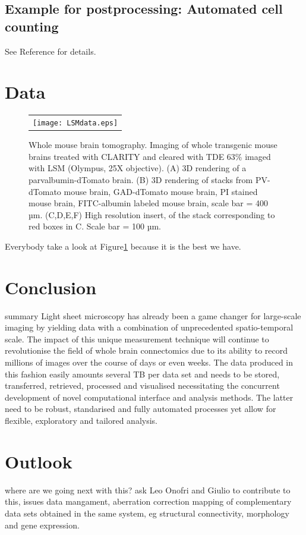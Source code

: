 \documentclass[12pt]{spieman}  %
\begin{document}
	\subsection{Example for postprocessing: Automated cell counting}
	See Reference\cite{Frasconi2014} for details.


\section{Data}

	\begin{figure}
   \begin{center}
   \begin{tabular}{c}
   \texttt{[image: LSMdata.eps]}
   \end{tabular}
   \end{center}
   \caption{\label{fig:LSMdata} Whole mouse brain tomography. Imaging of whole transgenic mouse brains treated with CLARITY and cleared with TDE 63\% imaged with LSM (Olympus, 25X objective). (A) 3D rendering of a parvalbumin-dTomato brain. (B) 3D rendering of stacks from PV-dTomato mouse brain, GAD-dTomato mouse brain,  PI stained mouse brain, FITC-albumin labeled mouse brain, scale bar = 400 µm. (C,D,E,F) High resolution insert, of the stack corresponding to red boxes in C. Scale bar = 100 µm.} 
   \end{figure}
	
	Everybody take a look at Figure\ref{fig:LSMdata} because it is the best we have. 

\section{Conclusion}
summary
Light sheet microscopy has already been a game changer for large-scale imaging by yielding data with a combination of unprecedented spatio-temporal scale. The impact of this unique measurement technique will continue to revolutionise the field of whole brain connectomics due to its ability to record millions of images over the course of days or even weeks. The data produced in this fashion easily amounts several TB per data set and needs to be stored, transferred, retrieved, processed and visualised necessitating the concurrent development of novel computational interface and analysis methods. The latter need to be robust, standarised and fully automated processes yet allow for flexible, exploratory and tailored analysis. 

\section{Outlook}
where are we going next with this? ask Leo Onofri and Giulio to contribute to this, issues data mangament, aberration correction
mapping of complementary data sets obtained in the same system, eg structural connectivity, morphology and gene expression. 
\end{document}
